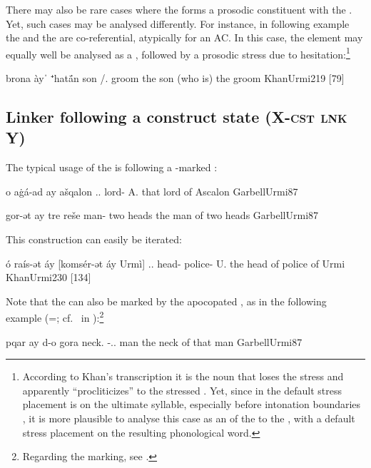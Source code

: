 There may also be rare cases where the \lnk* forms a prosodic constituent with the \prim. Yet, such cases may be analysed differently. For instance, in following example the \prim and the \secn are co-referential, atypically for an AC. In this case, the  element may equally well be analysed as a , followed by a prosodic stress due to hesitation:\footnote{According to Khan's transcription it is the noun that loses the stress and apparently \enquote{procliticizes} to the stressed \lnk*. Yet, since in \JUrm the default stress placement is on the ultimate syllable, especially before intonation boundaries \citep[46]{KhanUrmi}, it is more plausible to analyse this case as an  of the \lnk* to the \prim, with a default stress placement on the resulting phonological word.}  

{brona \cb{}àyˈ ⁺hatā́n}
{son \cb{}\lnk/\dem.\sg{} groom}
{the son (who is) the groom}
{KhanUrmi}{219 {[79]}}





\subsection{Linker following a construct state (X-\textsc{cst} \textsc{lnk} Y)} \label{ss:JUrm_cst_lnk}

The typical usage of the \lnk* is following a \cst-marked \prim:

{o aġá-ad ay ašqalon}
{\dem.\far.\sg{} lord-\cst{} \lnk{} A.}
{that lord of Ascalon}
{GarbellUrmi}{87}

{gor-ət ay tre reše}
{man-\cst{} \lnk{} two heads}
{the man of two heads}
{GarbellUrmi}{87}

This construction can easily be iterated: 

{ó raís-ət áy [komsér-ət áy Urmì]}
{\dem.\far.\sg{} head-\cst{} \lnk{} police-\cst{} \lnk{} U.}
{the head of police of Urmi}
{KhanUrmi}{230 {[134]}}

Note that the \prim can also be marked by the apocopated \cst*, as in the following example (=; cf.\  in \free*):\footnote{Regarding the \gen* marking, see .}

{pqar ay d-o gora}
{neck.\cst{} \lnk{} \gen-\dem.\far.\masc{} man}
{the neck of that man}
{GarbellUrmi}{87}

